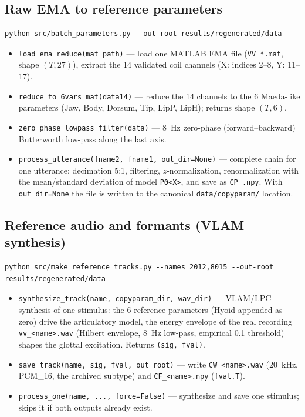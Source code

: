 \documentclass[11pt,a4paper]{article}
\begin{document}
\subsection{Raw EMA to reference parameters}
\begin{lstlisting}
python src/batch_parameters.py --out-root results/regenerated/data
\end{lstlisting}
\begin{itemize}
\item \texttt{load\_ema\_reduce(mat\_path)} --- load one MATLAB EMA file
      (\texttt{VV\_*.mat}, shape $(T, 27)$), extract the 14 validated
      coil channels (X: indices 2--8, Y: 11--17).
\item \texttt{reduce\_to\_6vars\_mat(data14)} --- reduce the 14 channels
      to the 6 Maeda-like parameters (Jaw, Body, Dorsum, Tip, LipP,
      LipH); returns shape $(T, 6)$.
\item \texttt{zero\_phase\_lowpass\_filter(data)} --- 8~Hz zero-phase
      (forward--backward) Butterworth low-pass along the last axis.
\item \texttt{process\_utterance(fname2, fname1, out\_dir=None)} ---
      complete chain for one utterance: decimation 5:1, filtering,
      $z$-normalization, renormalization with the mean/standard
      deviation of model \texttt{P0<X>}, and save as
      \texttt{CP\_<fname2>.npy}. With \texttt{out\_dir=None} the file is
      written to the canonical \texttt{data/copyparam/} location.
\end{itemize}

\subsection{Reference audio and formants (VLAM synthesis)}
\begin{lstlisting}
python src/make_reference_tracks.py --names 2012,8015 --out-root results/regenerated/data
\end{lstlisting}
\begin{itemize}
\item \texttt{synthesize\_track(name, copyparam\_dir, wav\_dir)} ---
      VLAM/LPC synthesis of one stimulus: the 6 reference parameters
      (Hyoid appended as zero) drive the articulatory model, the energy
      envelope of the real recording \texttt{vv\_<name>.wav} (Hilbert
      envelope, 8~Hz low-pass, empirical 0.1 threshold) shapes the
      glottal excitation. Returns \texttt{(sig, fval)}.
\item \texttt{save\_track(name, sig, fval, out\_root)} --- write
      \texttt{CW\_<name>.wav} (20~kHz, PCM\_16, the archived subtype)
      and \texttt{CF\_<name>.npy} (\texttt{fval.T}).
\item \texttt{process\_one(name, ..., force=False)} --- synthesize and
      save one stimulus; skips it if both outputs already exist.
\end{itemize}
\end{document}
